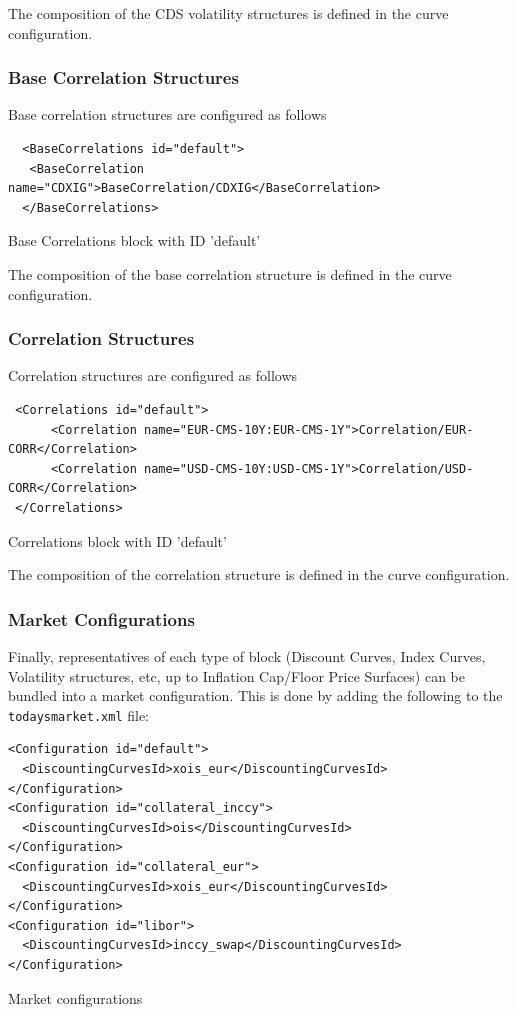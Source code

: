 \documentclass[12pt, a4paper]{article}
\begin{document}
{The composition of the CDS volatility structures is defined in the curve configuration.

\subsubsection{Base Correlation Structures}

Base correlation structures are configured as follows
\begin{listing}[H]
\begin{verbatim}
  <BaseCorrelations id="default">
   <BaseCorrelation name="CDXIG">BaseCorrelation/CDXIG</BaseCorrelation>
  </BaseCorrelations>
\end{verbatim}
\caption{Base Correlations block with ID 'default'}
\label{lst:basecorr_spec}
\end{listing}

The composition of the base correlation structure is defined in the curve configuration.

\subsubsection{Correlation Structures}

Correlation structures are configured as follows
\begin{listing}[H]
\begin{verbatim}
 <Correlations id="default">
      <Correlation name="EUR-CMS-10Y:EUR-CMS-1Y">Correlation/EUR-CORR</Correlation>  
      <Correlation name="USD-CMS-10Y:USD-CMS-1Y">Correlation/USD-CORR</Correlation>
 </Correlations>
\end{verbatim}
\caption{Correlations block with ID 'default'}
\label{lst:corr_spec}
\end{listing}

The composition of the correlation structure is defined in the curve configuration.
\subsubsection{Market Configurations}

Finally, representatives of each type of block (Discount Curves, Index Curves, Volatility structures, etc, up to
Inflation Cap/Floor Price Surfaces) can be bundled into a market configuration. This is done by adding the following to
the {\tt todaysmarket.xml} file:

\begin{listing}[H]
\begin{verbatim}
<Configuration id="default">
  <DiscountingCurvesId>xois_eur</DiscountingCurvesId>
</Configuration>
<Configuration id="collateral_inccy">
  <DiscountingCurvesId>ois</DiscountingCurvesId>
</Configuration>
<Configuration id="collateral_eur">
  <DiscountingCurvesId>xois_eur</DiscountingCurvesId>
</Configuration>
<Configuration id="libor">
  <DiscountingCurvesId>inccy_swap</DiscountingCurvesId>
</Configuration>
\end{verbatim}
\caption{Market configurations}
\label{lst:config_spec}
\end{listing}

}
\end{document}
